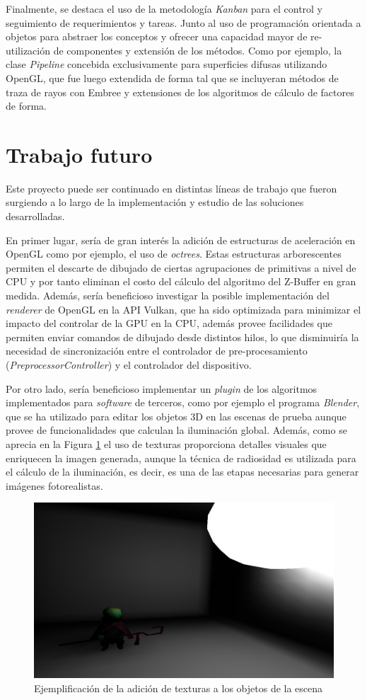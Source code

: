 Finalmente, se destaca el uso de la metodología \textit{Kanban} para el control y seguimiento de requerimientos y tareas. Junto al uso de programación orientada a objetos para abstraer los conceptos y ofrecer una capacidad mayor de re-utilización de componentes y extensión de los métodos. Como por ejemplo, la clase \textit{Pipeline} concebida exclusivamente para superficies difusas utilizando OpenGL, que fue luego extendida de forma tal que se incluyeran métodos de traza de rayos con Embree y extensiones de los algoritmos de cálculo de factores de forma. 

\section{Trabajo futuro}
\label{sec:futuro}

Este proyecto puede ser continuado en distintas líneas de trabajo que fueron surgiendo a lo largo de la implementación y estudio de las soluciones desarrolladas.

En primer lugar, sería de gran interés la adición de estructuras de aceleración en OpenGL como por ejemplo, el uso de \textit{octrees}. Estas estructuras arborescentes permiten el descarte de dibujado de ciertas agrupaciones de primitivas a nivel de CPU y por tanto eliminan el costo del cálculo del algoritmo del Z-Buffer en gran medida. Además, sería beneficioso investigar la posible implementación del \textit{renderer} de OpenGL en la API Vulkan, que ha sido optimizada para minimizar el impacto del controlar de la GPU en la CPU, además provee facilidades que permiten enviar comandos de dibujado desde distintos hilos, lo que disminuiría la necesidad de sincronización entre el controlador de pre-procesamiento (\textit{PreprocessorController}) y el controlador del dispositivo.

Por otro lado, sería beneficioso implementar un \textit{plugin} de los algoritmos implementados para \textit{software} de terceros, como por ejemplo el programa \textit{Blender}, que se ha utilizado para editar los objetos 3D en las escenas de prueba aunque provee de funcionalidades que calculan la iluminación global. Además, como se aprecia en la Figura \ref{img:text} el uso de texturas proporciona detalles visuales que enriquecen la imagen generada, aunque la técnica de radiosidad es utilizada para el cálculo de la iluminación, es decir, es una de las etapas necesarias para generar imágenes fotorealistas.

\begin{figure}[H]
	\centering
	\includegraphics[width=.7\linewidth]{assets/text}
	\caption{Ejemplificación de la adición de texturas a los objetos de la escena}
	\label{img:text}
\end{figure}


